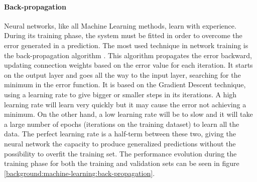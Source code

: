\documentclass[
  twoside,
  11pt, a4paper,
  footinclude=true,
  headinclude=true,
  cleardoublepage=empty
]{scrbook}
\begin{document}
        \paragraph{Back-propagation}
          Neural networks, like all Machine Learning methods, learn with experience. During its training phase, the system must be fitted in order to overcome the error generated in a prediction. The most used technique in network training is the back-propagation algorithm \cite{rumelhart1988backpropagating}. This algorithm propagates the error backward, updating connection weights based on the error value for each iteration. It starts on the output layer and goes all the way to the input layer, searching for the minimum in the error function. It is based on the Gradient Descent technique, using a learning rate to give bigger or smaller steps in its iterations. A high learning rate will learn very quickly but it may cause the error not achieving a minimum. On the other hand, a low learning rate will be to slow and it will take a large number of epochs (iterations on the training dataset) to learn all the data. The perfect learning rate is a half-term between these two, giving the neural network the capacity to produce generalized predictions without the possibility to overfit the training set. The performance evolution during the training phase for both the training and validation sets can be seen in figure \ref{background:machine-learning:back-propagation}.

\end{document}
